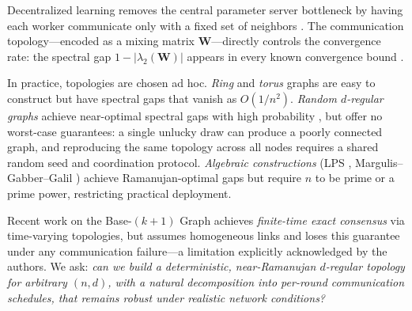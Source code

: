 \documentclass{article}
\newcommand{\bW}{\mathbf{W}}
\begin{document}
Decentralized learning removes the central parameter server bottleneck by
having each worker communicate only with a fixed set of neighbors
\cite{lian2017dpsgd, koloskova2020unified}.
The communication topology---encoded as a mixing matrix $\bW$---directly
controls the convergence rate: the spectral gap $1 - |\lambda_2(\bW)|$
appears in every known convergence bound
\cite{koloskova2020unified, neglia2020topology}.

In practice, topologies are chosen ad hoc.
\emph{Ring} and \emph{torus} graphs are easy to construct but have spectral
gaps that vanish as $O(1/n^2)$.
\emph{Random $d$-regular graphs} achieve near-optimal spectral gaps with high
probability \cite{bordenave2015}, but offer no worst-case guarantees: a
single unlucky draw can produce a poorly connected graph, and reproducing the
same topology across all nodes requires a shared random seed and coordination
protocol.
\emph{Algebraic constructions} (LPS \cite{lps1988}, Margulis--Gabber--Galil
\cite{margulis1988}) achieve Ramanujan-optimal gaps but require $n$ to be
prime or a prime power, restricting practical deployment.

Recent work on the Base-$(k{+}1)$ Graph \cite{takezawa2023base} achieves
\emph{finite-time exact consensus} via time-varying topologies, but
assumes homogeneous links and loses this guarantee under any communication
failure---a limitation explicitly acknowledged by the authors.
We ask: \emph{can we build a deterministic, near-Ramanujan $d$-regular
topology for arbitrary $(n,d)$, with a natural decomposition into
per-round communication schedules, that remains robust under realistic
network conditions?}
\end{document}
